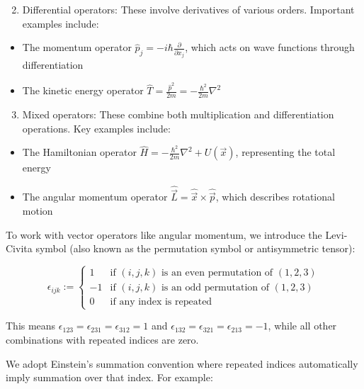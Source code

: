 \documentclass[italian]{HKNdocument}
\begin{document}
\begin{enumerate}
  \setcounter{enumi}{1}
  \item Differential operators: These involve derivatives of various orders. Important examples include:
\end{enumerate}

\begin{itemize}
  \item The momentum operator $\hat{p}_{j}=-i \hbar \frac{\partial}{\partial x_{j}}$, which acts on wave functions through differentiation
  \item The kinetic energy operator $\hat{T} = \frac{\hat{p}^2}{2m} = -\frac{\hbar^2}{2m}\nabla^2$
\end{itemize}


\begin{enumerate}
  \setcounter{enumi}{2}
  \item Mixed operators: These combine both multiplication and differentiation operations. Key examples include:
\end{enumerate}

\begin{itemize}
  \item The Hamiltonian operator $\hat{H}=-\frac{\hbar^{2}}{2 m} \nabla^{2}+U(\vec{x})$, representing the total energy
  \item The angular momentum operator $\hat{\vec{L}}=\hat{\vec{x}} \times \hat{\vec{p}}$, which describes rotational motion
\end{itemize}

To work with vector operators like angular momentum, we introduce the Levi-Civita symbol (also known as the permutation symbol or antisymmetric tensor):

\[
\epsilon_{i j k}:= \begin{cases}
1 & \text{if $(i,j,k)$ is an even permutation of $(1,2,3)$} \tag{1.43}\\
-1 & \text{if $(i,j,k)$ is an odd permutation of $(1,2,3)$} \\
0 & \text{if any index is repeated}
\end{cases}
\]

This means $\epsilon_{123} = \epsilon_{231} = \epsilon_{312} = 1$ and $\epsilon_{132} = \epsilon_{321} = \epsilon_{213} = -1$, while all other combinations with repeated indices are zero.

We adopt Einstein's summation convention where repeated indices automatically imply summation over that index. For example:
\end{document}
